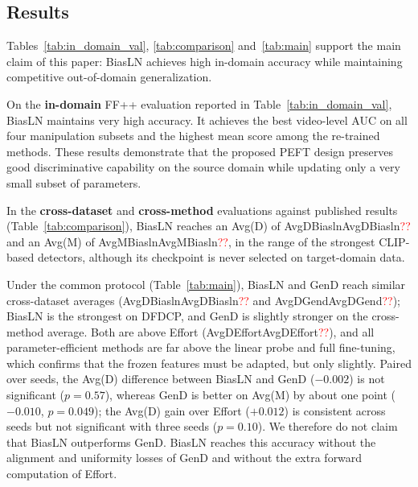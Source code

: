 \documentclass[fonts]{icst}
\newif\ifrevmark\revmarkfalse
\newcommand{\rev}[1]{\ifrevmark{\color{revblue}#1}\else#1\fi}
\newenvironment{revblock}{\ifrevmark\color{revblue}\fi}{}
\newcommand{\num}[1]{\ifcsname #1\endcsname\csname #1\endcsname\else\textcolor{red}{??}\fi}
\begin{document}
\subsection{Results}
\label{sec:main}

Tables~\ref{tab:in_domain_val}, \ref{tab:comparison} \rev{and~\ref{tab:main}} support the main claim of this paper: BiasLN achieves high in-domain accuracy while maintaining competitive out-of-domain generalization.

On the \textbf{in-domain} FF++ evaluation reported in Table~\ref{tab:in_domain_val}, BiasLN maintains very high accuracy. It achieves the best video-level AUC on all four manipulation subsets and the highest mean score \rev{among the re-trained methods}. These results \rev{demonstrate} that the proposed PEFT design preserves good discriminative capability on the source domain while updating only a very small subset of parameters.

\begin{revblock}
In the \textbf{cross-dataset} and \textbf{cross-method} evaluations against published results (Table~\ref{tab:comparison}), BiasLN reaches an Avg(D) of \num{AvgDBiasln} and an Avg(M) of \num{AvgMBiasln}, in the range of the strongest CLIP-based detectors, although its checkpoint is never selected on target-domain data.

Under the common protocol (Table~\ref{tab:main}), BiasLN and GenD reach similar cross-dataset averages (\num{AvgDBiasln} and \num{AvgDGend}); BiasLN is the strongest on DFDCP, and GenD is slightly stronger on the cross-method average. Both are above Effort (\num{AvgDEffort}), and all parameter-efficient methods are far above the linear probe and full fine-tuning, which confirms that the frozen features must be adapted, but only slightly. Paired over seeds, the Avg(D) difference between BiasLN and GenD ($-0.002$) is not significant ($p=0.57$), whereas GenD is better on Avg(M) by about one point ($-0.010$, $p=0.049$); the Avg(D) gain over Effort ($+0.012$) is consistent across seeds but not significant with three seeds ($p=0.10$). We therefore do not claim that BiasLN outperforms GenD. BiasLN reaches this accuracy without the alignment and uniformity losses of GenD and without the extra forward computation of Effort.
\end{revblock}

\begin{table}[!t]
  \centering
  \captionsetup{labelsep=period, labelfont=bf, hypcap=false}
  \caption{Ablation study of PEFT variants and the effect of $L_2$ normalization before the linear classifier.
\rev{Video AUC; Avg(D) and Avg(M) are mean $\pm$ standard deviation over $n$ seeds, per-dataset values are seed means. Bold: best; shaded: second best.}}
  \label{tab:ablation}
  \small
  \resizebox{0.85\textwidth}{!}{}
\end{table}
\end{document}
